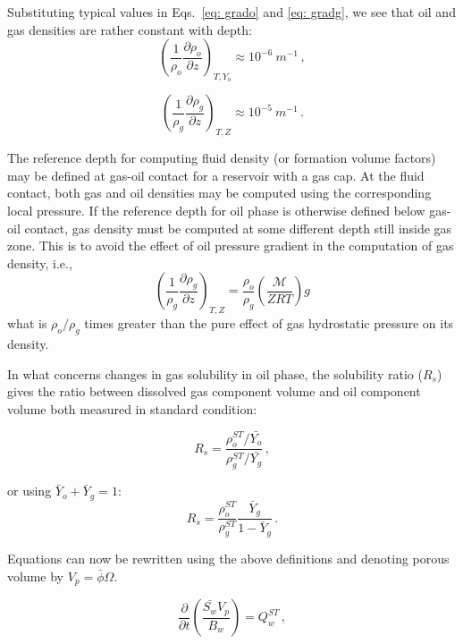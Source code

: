 \documentclass[authoryear,preprint,review,12pt]{elsarticle}
\begin{document}
Substituting typical values in Eqs.~\eqref{eq: grado} and \eqref{eq: gradg}, we see that oil and gas densities are rather constant with depth:
\begin{equation}
\left(\frac{1}{\rho_o}\frac{\partial \rho_o}{\partial z}\right)_{T,Y_o} \approx 10^{-6}\ m^{-1} \, ,
\end{equation}

\begin{equation}
\left(\frac{1}{\rho_g}\frac{\partial \rho_g}{\partial z}\right)_{T,Z} \approx 10^{-5}\ m^{-1} \, .
\end{equation}

The reference depth for computing fluid density (or formation volume factors) may be defined at gas-oil contact for a reservoir with a gas cap. At the fluid contact, both gas and oil densities may be computed using the corresponding local pressure. 
If the reference depth for oil phase is otherwise defined below gas-oil contact, gas density must be computed at some different depth still inside gas zone. This is to avoid the effect of oil pressure gradient in the computation of gas density, i.e.,
\begin{equation}
\left(\frac{1}{\rho_g}\frac{\partial \rho_g}{\partial z}\right)_{T,Z} = \frac{\rho_o}{\rho_g}\left(\frac{\mathcal{M}}{Z R T}\right)g
\end{equation}
what is $\rho_o / \rho_g$ times greater than the pure effect of gas hydrostatic pressure on its density.

In what concerns changes in gas solubility in oil phase, the solubility ratio ($R_s$) gives the ratio between dissolved gas component volume and oil component volume both measured in standard condition:

\begin{equation}
R_s = \frac{\rho_o^{ST} / \bar{Y_o}}{\rho_g^{ST} / \bar{Y_g}} \, ,
\end{equation}

or using $\bar{Y}_o + \bar{Y}_g = 1$:
\begin{equation}
R_s = \frac{\rho_o^{ST}}{\rho_g^{ST}}\frac{\bar{Y}_g}{1-\bar{Y}_g} \, .
\end{equation}

Equations can now be rewritten using the above definitions and denoting porous volume by $V_p = \bar{\phi}\Omega$.

\begin{equation}\label{eq: Sw4}
\frac{\partial}{\partial t} \left(\frac{\bar{S_w} V_p}{B_w} \right) = Q_w^{ST} \, ,
\end{equation}
\end{document}
